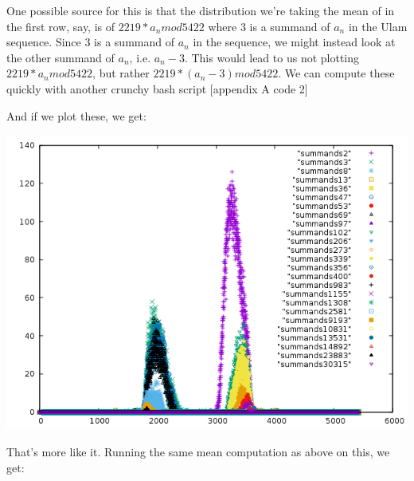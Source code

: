 \documentclass{article}
\theoremstyle{definition}
\theoremstyle{remark}
\numberwithin{equation}{section}
\begin{document}
{One possible source for this is that the distribution we're taking the
mean of in the first row, say, is of $2219*a_n mod 5422$ where 3 is a
summand of $a_n$ in the Ulam sequence.  Since 3 is a summand of $a_n$ in
the sequence, we might instead look at the other summand of $a_n$,
i.e. $a_n - 3$.  This would lead to us not plotting $2219*a_n mod 5422$,
but rather $2219*(a_n-3) mod 5422$.  We can compute these quickly with
another crunchy bash script [appendix A code 2]

And if we plot these, we get: 

\includegraphics[scale=0.5]{../figs/shifted_summands_mod_5422.png}

That's more like it.  Running the same mean computation as above on this, we get:

}
\end{document}
